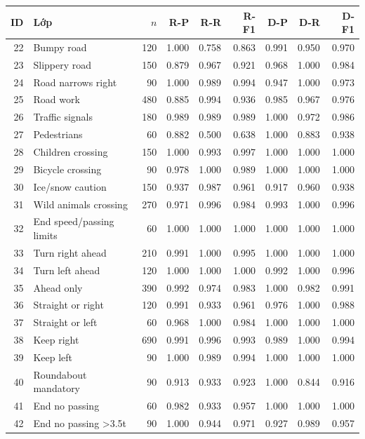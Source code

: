 \begin{tabular}{r p{42mm} r rrr rrr}
\toprule
ID & Lớp & $n$ & R-P & R-R & R-F1 & D-P & D-R & D-F1\\
\midrule
22 & Bumpy road & 120 & 1.000 & 0.758 & 0.863 & 0.991 & 0.950 & 0.970\\
23 & Slippery road & 150 & 0.879 & 0.967 & 0.921 & 0.968 & 1.000 & 0.984\\
24 & Road narrows right & 90 & 1.000 & 0.989 & 0.994 & 0.947 & 1.000 & 0.973\\
25 & Road work & 480 & 0.885 & 0.994 & 0.936 & 0.985 & 0.967 & 0.976\\
26 & Traffic signals & 180 & 0.989 & 0.989 & 0.989 & 1.000 & 0.972 & 0.986\\
27 & Pedestrians & 60 & 0.882 & 0.500 & 0.638 & 1.000 & 0.883 & 0.938\\
28 & Children crossing & 150 & 1.000 & 0.993 & 0.997 & 1.000 & 1.000 & 1.000\\
29 & Bicycle crossing & 90 & 0.978 & 1.000 & 0.989 & 1.000 & 1.000 & 1.000\\
30 & Ice/snow caution & 150 & 0.937 & 0.987 & 0.961 & 0.917 & 0.960 & 0.938\\
31 & Wild animals crossing & 270 & 0.971 & 0.996 & 0.984 & 0.993 & 1.000 & 0.996\\
32 & End speed/passing limits & 60 & 1.000 & 1.000 & 1.000 & 1.000 & 1.000 & 1.000\\
33 & Turn right ahead & 210 & 0.991 & 1.000 & 0.995 & 1.000 & 1.000 & 1.000\\
34 & Turn left ahead & 120 & 1.000 & 1.000 & 1.000 & 0.992 & 1.000 & 0.996\\
35 & Ahead only & 390 & 0.992 & 0.974 & 0.983 & 1.000 & 0.982 & 0.991\\
36 & Straight or right & 120 & 0.991 & 0.933 & 0.961 & 0.976 & 1.000 & 0.988\\
37 & Straight or left & 60 & 0.968 & 1.000 & 0.984 & 1.000 & 1.000 & 1.000\\
38 & Keep right & 690 & 0.991 & 0.996 & 0.993 & 0.989 & 1.000 & 0.994\\
39 & Keep left & 90 & 1.000 & 0.989 & 0.994 & 1.000 & 1.000 & 1.000\\
40 & Roundabout mandatory & 90 & 0.913 & 0.933 & 0.923 & 1.000 & 0.844 & 0.916\\
41 & End no passing & 60 & 0.982 & 0.933 & 0.957 & 1.000 & 1.000 & 1.000\\
42 & End no passing >3.5t & 90 & 1.000 & 0.944 & 0.971 & 0.927 & 0.989 & 0.957\\
\bottomrule
\end{tabular}
